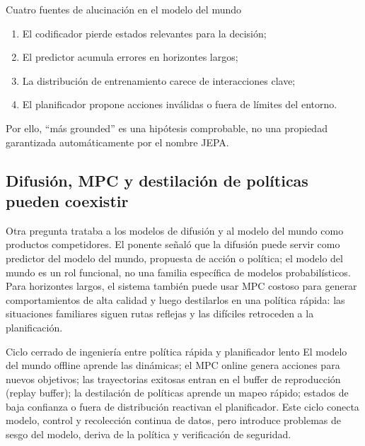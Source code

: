 
\begin{warningbox}{Cuatro fuentes de alucinación en el modelo del mundo}
\begin{enumerate}
  \item El codificador pierde estados relevantes para la decisión;
  \item El predictor acumula errores en horizontes largos;
  \item La distribución de entrenamiento carece de interacciones clave;
  \item El planificador propone acciones inválidas o fuera de límites del entorno.
\end{enumerate}
Por ello, ``más grounded'' es una hipótesis comprobable, no una propiedad garantizada automáticamente por el nombre JEPA.
\end{warningbox}

\subsection{Difusión, MPC y destilación de políticas pueden coexistir}

Otra pregunta trataba a los modelos de difusión y al modelo del mundo como productos competidores. El ponente señaló que la difusión puede servir como predictor del modelo del mundo, propuesta de acción o política; el modelo del mundo es un rol funcional, no una familia específica de modelos probabilísticos. Para horizontes largos, el sistema también puede usar MPC costoso para generar comportamientos de alta calidad y luego destilarlos en una política rápida: las situaciones familiares siguen rutas reflejas y las difíciles retroceden a la planificación.


\begin{importantbox}{Ciclo cerrado de ingeniería entre política rápida y planificador lento}
El modelo del mundo offline aprende las dinámicas; el MPC online genera acciones para nuevos objetivos; las trayectorias exitosas entran en el buffer de reproducción (replay buffer); la destilación de políticas aprende un mapeo rápido; estados de baja confianza o fuera de distribución reactivan el planificador. Este ciclo conecta modelo, control y recolección continua de datos, pero introduce problemas de sesgo del modelo, deriva de la política y verificación de seguridad.
\end{importantbox}

